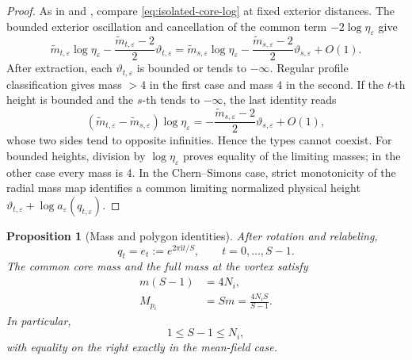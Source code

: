 \documentclass[11pt,reqno]{amsart}
\numberwithin{equation}{section}
\newtheorem{proposition}[theorem]{Proposition}
\theoremstyle{definition}
\theoremstyle{remark}
\newcommand{\eps}{\varepsilon}
\newcommand{\etae}{\eta_{\eps}}
\begin{document}
\begin{proof}
As in \cite[Lemma~3.3]{CKL} and
\cite[proof of Theorem~1.1]{LinYanAIHP}, compare
\eqref{eq:isolated-core-log} at fixed exterior distances.
The bounded exterior oscillation and cancellation of the common
term $-2\log\etae$ give
\begin{equation}\label{eq:qualitative-mass-comparison}
 \widetilde m_{t,\eps}\log\etae
 -\frac{\widetilde m_{t,\eps}-2}{2}\vartheta_{t,\eps}
 =\widetilde m_{s,\eps}\log\etae
 -\frac{\widetilde m_{s,\eps}-2}{2}\vartheta_{s,\eps}+O(1).
\end{equation}
After extraction, each $\vartheta_{t,\eps}$ is bounded or tends to
$-\infty$. Regular profile classification gives mass $>4$ in the
first case and mass $4$ in the second. If the $t$-th height is
bounded and the $s$-th tends to $-\infty$, the last identity reads
\[
 (\widetilde m_{t,\eps}-\widetilde m_{s,\eps})\log\etae
 =-\frac{\widetilde m_{s,\eps}-2}{2}\vartheta_{s,\eps}+O(1),
\]
whose two sides tend to opposite infinities. Hence the types cannot
coexist. For bounded heights, division by $\log\etae$ proves
equality of the limiting masses; in the other case every mass is
$4$. In the Chern--Simons case, strict monotonicity of the radial
mass map identifies a common limiting normalized physical height
$\vartheta_{t,\eps}+\log a_\eps(q_{t,\eps})$.
\end{proof}

\begin{proposition}[Mass and polygon identities]\label{prop:polygon}
After rotation and relabeling,
\begin{equation}\label{eq:regular-polygon}
 q_t=e_t:=e^{2\pi\mathrm i t/S},\qquad t=0,\ldots,S-1.
\end{equation}
The common core mass and the full mass at the vortex satisfy
\begin{align}
 m(S-1)&=4N_i,\label{eq:mass-location}\\
 M_{p_i}&=Sm=\frac{4N_iS}{S-1}.\label{eq:local-total-mass}
\end{align}
In particular,
\begin{equation}\label{eq:S-bound}
 1\le S-1\le N_i,
\end{equation}
with equality on the right exactly in the mean-field case.
\end{proposition}
\end{document}
